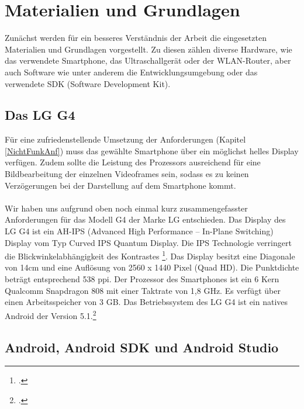 \chapter{Materialien und Grundlagen}

Zunächst werden für ein besseres Verständnis der Arbeit die eingesetzten Materialien und Grundlagen vorgestellt. Zu diesen zählen diverse Hardware, wie das verwendete Smartphone, das Ultraschallgerät oder der WLAN-Router, aber auch Software wie unter anderem die Entwicklungsumgebung oder das verwendete SDK (Software Development Kit). 

\section{Das LG G4}

Für eine zufriedenstellende Umsetzung der Anforderungen (Kapitel \ref{NichtFunkAnf}) muss das gewählte Smartphone über ein möglichst helles Display verfügen. Zudem sollte die Leistung des Prozessors ausreichend für eine Bildbearbeitung der einzelnen Videoframes sein, sodass es zu keinen Verzögerungen bei der Darstellung auf dem Smartphone kommt.
\\ 
\\
Wir haben uns aufgrund oben noch einmal kurz zusammengefasster Anforderungen für das Modell G4 der Marke LG entschieden.  Das Display des LG G4 ist ein AH-IPS (Advanced High Performance – In-Plane Switching) Display vom Typ Curved IPS Quantum Display. Die IPS Technologie verringert die Blickwinkelabhängigkeit des Kontrastes \footcite{LC-Schirme}. Das Display besitzt eine Diagonale von 14cm und eine Auflösung von 2560 x 1440 Pixel (Quad HD). Die Punktdichte beträgt entsprechend 538 ppi. Der Prozessor des Smartphones ist ein 6 Kern Qualcomm Snapdragon 808 mit einer Taktrate von 1,8 GHz. Es verfügt über einen Arbeitsspeicher von 3 GB. Das Betriebssystem des LG G4 ist ein natives Android der Version 5.1.\footcite{LGG4} 

\section{Android, Android SDK und Android Studio} \label{Android}

